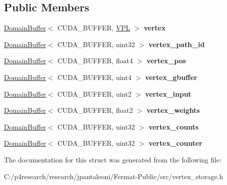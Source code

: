 \subsection*{Public Members}
\begin{DoxyCompactItemize}
\item 
\mbox{\label{struct_vertex_storage_a0ad2614105f86c3623157a1ec02e44db}} 
\hyperlink{class_domain_buffer}{Domain\+Buffer}$<$ C\+U\+D\+A\+\_\+\+B\+U\+F\+F\+ER, \hyperlink{struct_v_p_l}{V\+PL} $>$ {\bfseries vertex}
\item 
\mbox{\label{struct_vertex_storage_a09a21e5038ec74709b041b8e6e3d4e59}} 
\hyperlink{class_domain_buffer}{Domain\+Buffer}$<$ C\+U\+D\+A\+\_\+\+B\+U\+F\+F\+ER, uint32 $>$ {\bfseries vertex\+\_\+path\+\_\+id}
\item 
\mbox{\label{struct_vertex_storage_a89045da1a08c781d812a9dd9550a394b}} 
\hyperlink{class_domain_buffer}{Domain\+Buffer}$<$ C\+U\+D\+A\+\_\+\+B\+U\+F\+F\+ER, float4 $>$ {\bfseries vertex\+\_\+pos}
\item 
\mbox{\label{struct_vertex_storage_a75d9abbd6820f319c2a6b5362b163637}} 
\hyperlink{class_domain_buffer}{Domain\+Buffer}$<$ C\+U\+D\+A\+\_\+\+B\+U\+F\+F\+ER, uint4 $>$ {\bfseries vertex\+\_\+gbuffer}
\item 
\mbox{\label{struct_vertex_storage_a5807012cec5f2b1f9bcd781967a8542b}} 
\hyperlink{class_domain_buffer}{Domain\+Buffer}$<$ C\+U\+D\+A\+\_\+\+B\+U\+F\+F\+ER, uint2 $>$ {\bfseries vertex\+\_\+input}
\item 
\mbox{\label{struct_vertex_storage_ad90288080934a1b74428e3f853efd62d}} 
\hyperlink{class_domain_buffer}{Domain\+Buffer}$<$ C\+U\+D\+A\+\_\+\+B\+U\+F\+F\+ER, float2 $>$ {\bfseries vertex\+\_\+weights}
\item 
\mbox{\label{struct_vertex_storage_a9a41c907774d80174230e4e52b078cdc}} 
\hyperlink{class_domain_buffer}{Domain\+Buffer}$<$ C\+U\+D\+A\+\_\+\+B\+U\+F\+F\+ER, uint32 $>$ {\bfseries vertex\+\_\+counts}
\item 
\mbox{\label{struct_vertex_storage_ad5e5bf739cc9e94df5fc6012ac250fb0}} 
\hyperlink{class_domain_buffer}{Domain\+Buffer}$<$ C\+U\+D\+A\+\_\+\+B\+U\+F\+F\+ER, uint32 $>$ {\bfseries vertex\+\_\+counter}
\end{DoxyCompactItemize}


The documentation for this struct was generated from the following file\+:\begin{DoxyCompactItemize}
\item 
C\+:/p4research/research/jpantaleoni/\+Fermat-\/\+Public/src/vertex\+\_\+storage.\+h\end{DoxyCompactItemize}
